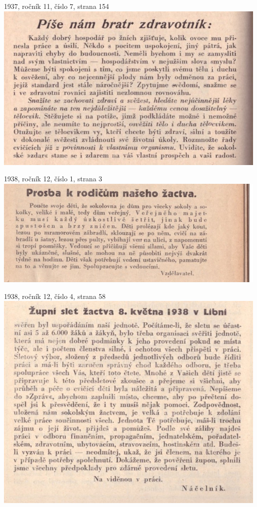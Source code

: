 \documentclass[11pt]{article}
\begin{document}
1937, ročník 11, číslo 7, strana 154 \\
\includegraphics[width=\imagewidth]{original/1937/Skener_20250325 (6).jpg}




\vspace*{\baselineskip}
1938, ročník 12, číslo 1, strana 3 \\
\includegraphics[width=\imagewidth]{original/1938/Skener_20250318.jpg}

1938, ročník 12, číslo 4, strana 58 \\
\includegraphics[width=\imagewidth]{original/1938/Skener_20250318 (2).jpg}
\end{document}

